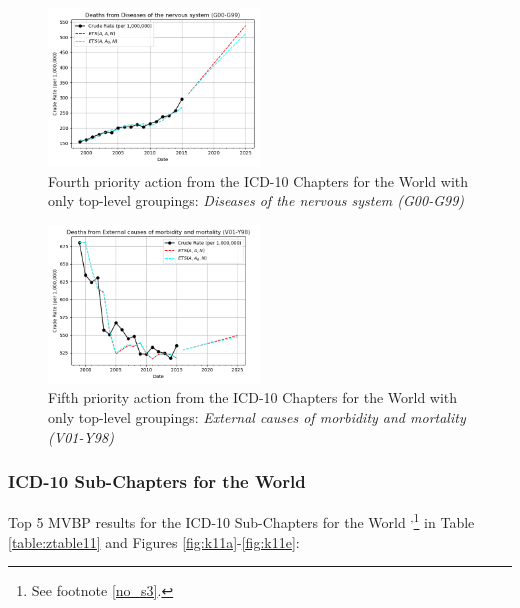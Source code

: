 \documentclass[10pt, a4paper, twocolumn]{IEEEconf}
\newcommand\footnotesstartsep{\textsuperscript{,}}
\begin{document}
\begin{figure}[H]
  \centering
  \includegraphics[width=0.5\textwidth]{results/WORLD_ICD10_CHAPTER_ROOTS/Diseases_of_the_nervous_system_G00-G99_ets.png}
  \caption{Fourth priority action from the ICD-10 Chapters for the World with only top-level groupings: \textit{Diseases of the nervous system (G00-G99)}}\label{fig:k10d}
\end{figure}

\begin{figure}[H]
  \centering
  \includegraphics[width=0.5\textwidth]{results/WORLD_ICD10_CHAPTER_ROOTS/External_causes_of_morbidity_and_mortality_V01-Y98_ets.png}
  \caption{Fifth priority action from the ICD-10 Chapters for the World with only top-level groupings: \textit{External causes of morbidity and mortality (V01-Y98)}}\label{fig:k10e}
\end{figure}

\clearpage

\subsubsection{ICD-10 Sub-Chapters for the World}

Top 5 MVBP results for the ICD-10 Sub-Chapters for the World \citep{whomortality}\footnotesstartsep\footnote{See footnote \ref{no_s3}.} in Table \ref{table:ztable11} and Figures \ref{fig:k11a}-\ref{fig:k11e}:
\end{document}

